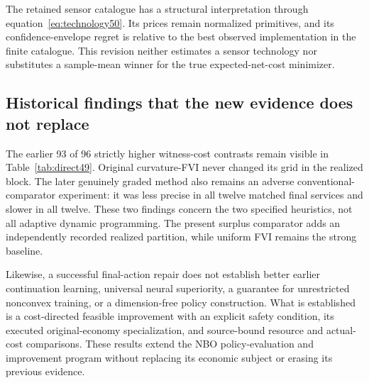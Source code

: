 The retained sensor catalogue has a structural interpretation through equation~\eqref{eq:technology50}. Its prices remain normalized primitives, and its confidence-envelope regret is relative to the best observed implementation in the finite catalogue. This revision neither estimates a sensor technology nor substitutes a sample-mean winner for the true expected-net-cost minimizer.

\subsection{Historical findings that the new evidence does not replace}
The earlier 93 of 96 strictly higher witness-cost contrasts remain visible in Table~\ref{tab:direct49}. Original curvature-FVI never changed its grid in the realized block. The later genuinely graded method also remains an adverse conventional-comparator experiment: it was less precise in all twelve matched final services and slower in all twelve. These two findings concern the two specified heuristics, not all adaptive dynamic programming. The present surplus comparator adds an independently recorded realized partition, while uniform FVI remains the strong baseline.

Likewise, a successful final-action repair does not establish better earlier continuation learning, universal neural superiority, a guarantee for unrestricted nonconvex training, or a dimension-free policy construction. What is established is a cost-directed feasible improvement with an explicit safety condition, its executed original-economy specialization, and source-bound resource and actual-cost comparisons. These results extend the NBO policy-evaluation and improvement program without replacing its economic subject or erasing its previous evidence.
